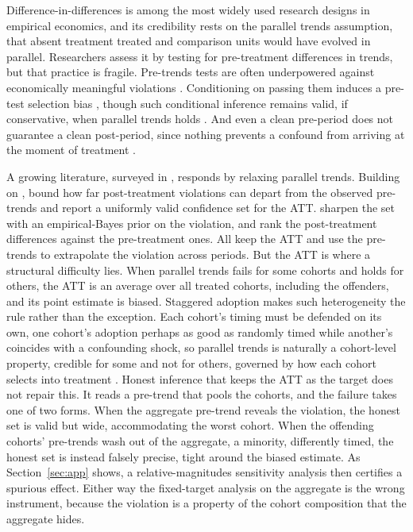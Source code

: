\documentclass[12pt]{article}
\theoremstyle{remark}
\begin{document}
Difference-in-differences is among the most widely used research designs in empirical economics, and its
credibility rests on the parallel trends assumption, that absent treatment treated and comparison units
would have evolved in parallel. Researchers assess it by testing for pre-treatment differences in trends,
but that practice is fragile. Pre-trends tests are often underpowered against economically meaningful
violations \citep{bilinski2020, freyaldenhoven2019, kahnlang2020, roth2022pretrends}. Conditioning on
passing them induces a pre-test selection bias \citep{roth2022pretrends}, though such conditional inference
remains valid, if conservative, when parallel trends holds \citep{dechaisemartin2024pretest}. And even a clean pre-period
does not guarantee a clean post-period, since nothing prevents a confound from arriving at the moment of
treatment \citep{kahnlang2020}.

A growing literature, surveyed in \citet{roth2023trending}, responds by relaxing parallel trends. Building
on \citet{manski2018}, \citet{rambachan2023} bound how far
post-treatment violations can depart from the observed pre-trends and report a uniformly valid confidence
set for the ATT. \citet{kwonroth2024} sharpen the set with an empirical-Bayes prior on the violation, and
\citet{dechaisemartin2026} rank the post-treatment differences against the pre-treatment ones. All keep
the ATT and use the pre-trends to extrapolate the violation across periods. But the ATT is where a
structural difficulty lies. When parallel trends fails for some cohorts and holds for others, the ATT is
an average over all treated cohorts, including the offenders, and its point estimate is biased. Staggered
adoption makes such heterogeneity the rule rather than the exception. Each cohort's timing must be defended
on its own, one cohort's adoption perhaps as good as randomly timed while another's coincides with a
confounding shock, so parallel trends is naturally a cohort-level property, credible for some and not for
others, governed by how each cohort selects into treatment \citep{ghanem2022selection}. Honest inference that keeps the ATT as the target does not repair this. It reads a pre-trend that pools the
cohorts, and the failure takes one of two forms. When the aggregate pre-trend reveals the violation, the
honest set is valid but wide, accommodating the worst cohort. When the offending cohorts' pre-trends wash
out of the aggregate, a minority, differently timed, the honest set is instead falsely precise, tight
around the biased estimate. As Section~\ref{sec:app} shows, a relative-magnitudes sensitivity analysis then
certifies a spurious effect. Either way the fixed-target analysis on the aggregate is the wrong instrument,
because the violation is a property of the cohort composition that the aggregate hides.
\end{document}
